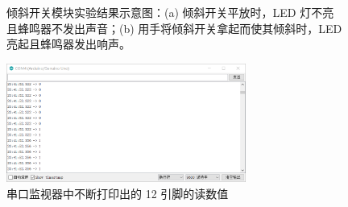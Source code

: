 \documentclass[UTF8, oneside]{ctexbook}
\begin{document}
\begin{figure}[h]
    \centering


    \centering
    \caption{倾斜开关模块实验结果示意图：(a) 倾斜开关平放时，LED 灯不亮
    且蜂鸣器不发出声音；(b) 用手将倾斜开关拿起而使其倾斜时，LED 亮起且蜂鸣器发出响声。}
    \label{s19_1}
    
\end{figure}

\begin{figure}[h]
    \centering
    \includegraphics[width=0.7\textwidth]{./result/sensor/19/result1.png}
    \caption{串口监视器中不断打印出的 12 引脚的读数值}
    \label{s19_2}
\end{figure}
\end{document}
